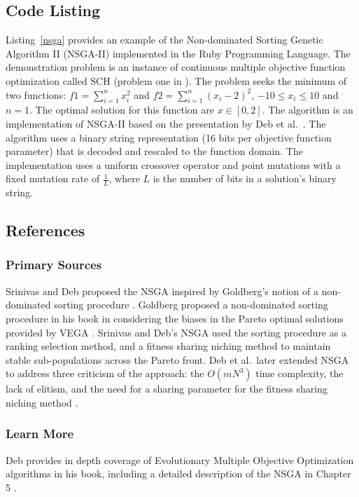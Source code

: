 \subsection{Code Listing}
Listing~\ref{nsga} provides an example of the Non-dominated Sorting Genetic Algorithm II (NSGA-II) implemented in the Ruby Programming Language.
The demonstration problem is an instance of continuous multiple objective function optimization called SCH (problem one in \cite{Deb2002}). The problem seeks the minimum of two functions: $f1=\sum_{i=1}^n x_{i}^2$ and $f2=\sum_{i=1}^n (x_{i}-2)^2$, $-10\leq x_i \leq 10$ and $n=1$. The optimal solution for this function are $x \in [0,2]$.
The algorithm is an implementation of NSGA-II based on the presentation by Deb et al.\ \cite{Deb2002}.
The algorithm uses a binary string representation (16 bits per objective function parameter) that is decoded and rescaled to the function domain. The implementation uses a uniform crossover operator and point mutations with a fixed mutation rate of $\frac{1}{L}$, where $L$ is the number of bits in a solution's binary string. 



\subsection{References}

% 
% 
\subsubsection{Primary Sources}
Srinivas and Deb proposed the NSGA inspired by Goldberg's notion of a non-dominated sorting procedure \cite{Srinivas1994}. Goldberg proposed a non-dominated sorting procedure in his book in considering the biases in the Pareto optimal solutions provided by VEGA \cite{Goldberg1989}. Srinivas and Deb's NSGA used the sorting procedure as a ranking selection method, and a fitness sharing niching method to maintain stable sub-populations across the Pareto front.
Deb et al.\ later extended NSGA to address three criticism of the approach: the $O(mN^3)$ time complexity, the lack of elitism, and the need for a sharing parameter for the fitness sharing niching method \cite{Deb2000, Deb2002}.

% 
% 
\subsubsection{Learn More}
Deb provides in depth coverage of Evolutionary Multiple Objective Optimization algorithms in his book, including a detailed description of the NSGA in Chapter 5 \cite{Deb2001}.
